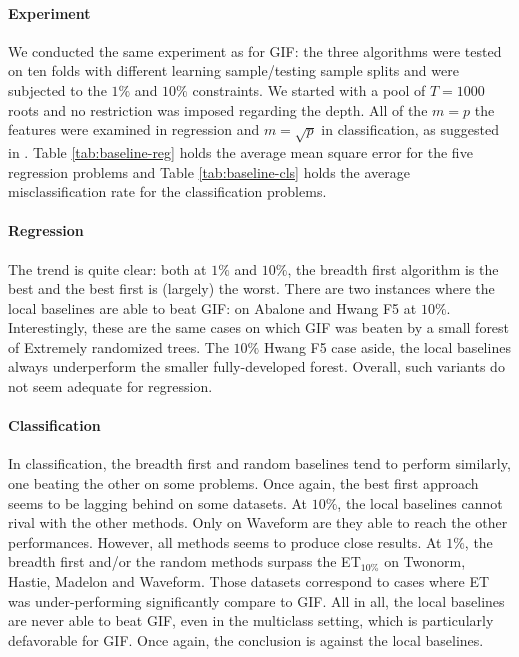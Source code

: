 \documentclass{article}
\begin{document}
\paragraph{Experiment}
We conducted the same experiment as for GIF: the three algorithms were tested 
on ten folds with different learning sample/testing sample splits and were 
subjected to the $1\%$ and $10\%$ constraints. We started with a pool of 
$T=1000$ roots and no restriction was imposed regarding the depth. All of the 
$m=p$ the features were examined in regression and $m=\sqrt{p}$ in 
classification, as suggested in \cite{extratrees}. Table \ref{tab:baseline-reg} 
holds the average mean square error for the five regression problems and Table 
\ref{tab:baseline-cls} holds the average misclassification rate for the 
classification problems.

\paragraph{Regression}
The trend is quite clear: both at $1\%$ and $10\%$, the breadth first algorithm 
is the best and the best first is (largely) the worst. 
There are two instances where the local baselines are able to beat GIF: on 
Abalone and Hwang F5 at $10\%$. Interestingly, these are the same cases on 
which GIF was beaten by a small forest of Extremely randomized trees. The 
$10\%$ Hwang F5 case aside, the local baselines always underperform the smaller 
fully-developed forest. Overall, such variants do not seem adequate for 
regression.

\paragraph{Classification}
In classification, the breadth first and random baselines tend to perform 
similarly, one beating the other on some problems. Once again, the best first 
approach seems to be lagging behind on some datasets. At $10\%$, the local 
baselines cannot rival with the other methods. Only on Waveform are they able 
to reach the other performances. However, all methods seems to produce close 
results. At $1\%$, the breadth first and/or the random methods surpass the 
ET$_{10\%}$ on Twonorm, Hastie, Madelon and Waveform. Those datasets correspond 
to cases where ET was under-performing significantly compare to GIF. All in 
all, the local baselines are never able to beat GIF, even in the multiclass 
setting, which is particularly defavorable for GIF. Once again, the conclusion 
is against the local baselines.
\end{document}
